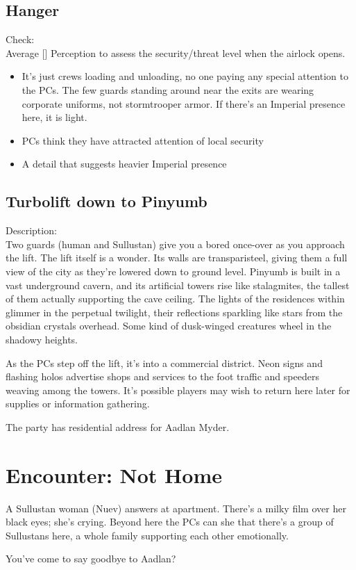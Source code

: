 \documentclass{book}
\newcommand{\df}{\difficulty}
\begin{document}
\begin{multicols*}{2}
\subsection{Hanger}
Check:\\
Average [\df\df] Perception to assess the security/threat level when the airlock opens.
\begin{itemize}
    \item \success It’s just crews loading and unloading, no one paying any special attention to the PCs. The few guards standing around near the exits are wearing corporate uniforms, not stormtrooper armor. If there’s an Imperial presence here, it is light.
    \item \failure PCs think they have attracted attention of local security
    \item \threat A detail that suggests heavier Imperial presence
\end{itemize}

\subsection{Turbolift down to Pinyumb}
Description:\\
Two guards (human and Sullustan) give you a bored once-over as you approach the lift. The lift itself is a wonder. Its walls are transparisteel, giving them a full view of the city as they’re lowered down to ground level. Pinyumb is built in a vast underground cavern, and its artificial towers rise like stalagmites, the tallest of them actually supporting the cave ceiling. The lights of the residences within glimmer in the perpetual twilight, their reflections sparkling like stars from the obsidian crystals overhead. Some kind of dusk-winged creatures wheel in the shadowy heights.

As the PCs step off the lift, it’s into a commercial district. Neon signs and flashing holos advertise shops and services to the foot traffic and speeders weaving among the towers. It's possible players may wish to return here later for supplies or information gathering.

The party has residential address for Aadlan Myder.

\section{Encounter: Not Home}

A Sullustan woman (Nuev) answers at apartment. There’s a milky film over her black eyes; she’s crying. Beyond here the PCs can she that there’s a group of Sullustans here, a whole family supporting each other emotionally. 
\begin{quoting}
You’ve come to say goodbye to Aadlan? 
\end{quoting}


\end{multicols*}
\end{document}
